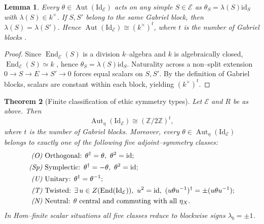 \documentclass[12pt]{article}
\DeclareMathOperator{\Aut}{Aut}
\newcommand{\Id}{\mathrm{Id}}
\newcommand{\E}{\mathcal{E}}
\newcommand{\End}{\operatorname{End}}
\newcommand{\id}{\mathrm{id}}
\theoremstyle{plain}
\newtheorem{theorem}{Theorem}[section]
\newtheorem{lemma}[theorem]{Lemma}
\theoremstyle{definition}
\theoremstyle{remark}
\numberwithin{equation}{section}
\begin{document}
\begin{lemma}\label{lem:blockscalar}
Every $\theta\in\Aut(\Id_\E)$ acts on any simple $S\in\E$ as $\theta_S=\lambda(S)\id_S$ with $\lambda(S)\in k^\times$.  
If $S,S'$ belong to the same Gabriel block, then $\lambda(S)=\lambda(S')$.  
Hence $\Aut(\Id_\E)\cong(k^\times)^t$, where $t$ is the number of Gabriel blocks \cite{Gabriel62}.
\end{lemma}

\begin{proof}
Since $\End_\E(S)$ is a division $k$–algebra and $k$ is algebraically closed, $\End_\E(S)\simeq k$ \cite{Weibel1994}, hence $\theta_S=\lambda(S)\id_S$.  
Naturality across a non–split extension $0\to S\to E\to S'\to0$ forces equal scalars on $S,S'$.  
By the definition of Gabriel blocks, scalars are constant within each block, yielding $(k^\times)^t$.
\end{proof}

\begin{theorem}[Finite classification of ethic symmetry types]\label{th:finitefive}
Let $\E$ and $R$ be as above.  
Then
\[
\Aut_\eta(\Id_\E)\cong(\mathbb Z/2\mathbb Z)^t,
\]
where $t$ is the number of Gabriel blocks.  
Moreover, every $\theta\in\Aut_\eta(\Id_\E)$ belongs to exactly one of the following five adjoint–symmetry classes:
\begin{align*}
\text{\emph{(O)}}&\text{ Orthogonal: }\theta^{\dagger}=\theta,\ \theta^2=\id;\\
\text{\emph{(Sp)}}&\text{ Symplectic: }\theta^{\dagger}=-\theta,\ \theta^2=\id;\\
\text{\emph{(U)}}&\text{ Unitary: }\theta^{\dagger}=\theta^{-1};\\
\text{\emph{(T)}}&\text{ Twisted: }\exists\,u\in Z(\End(\Id_\E)),\ u^2=\id,\ (u\theta u^{-1})^{\dagger}=\pm(u\theta u^{-1});\\
\text{\emph{(N)}}&\text{ Neutral: }\theta\text{ central and commuting with all }\eta_X.
\end{align*}
In Hom–finite scalar situations all five classes reduce to blockwise signs $\lambda_b=\pm1$.
\end{theorem}
\end{document}
